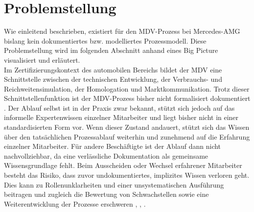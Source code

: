 \chapter{Problemstellung}
\label{chap:problemkontext}
Wie einleitend beschrieben, existiert für den MDV-Prozess bei Mercedes-AMG bislang kein dokumentiertes bzw. modelliertes Prozessmodell. Diese Problemstellung wird im folgenden Abschnitt anhand eines Big Picture visualisiert und erläutert.
\\
Im Zertifizierungskontext des automobilen Bereichs bildet der MDV eine Schnittstelle zwischen der technischen Entwicklung, der Verbrauchs- und Reichweitensimulation, der Homologation und Marktkommunikation. Trotz dieser Schnittstellenfunktion ist der MDV-Prozess bisher nicht formalisiert dokumentiert . Der Ablauf selbst ist in der Praxis zwar bekannt, stützt sich jedoch auf das informelle Expertenwissen einzelner Mitarbeiter und liegt bisher nicht in einer standardisierten Form vor. Wenn dieser Zustand andauert, stützt sich das Wissen über den tatsächlichen Prozessablauf weiterhin und zunehmend auf die Erfahrung einzelner Mitarbeiter. Für andere Beschäftigte ist der Ablauf dann nicht nachvollziehbar, da eine verlässliche Dokumentation als gemeinsame Wissensgrundlage fehlt. Beim Ausscheiden oder Wechsel erfahrener Mitarbeiter besteht das Risiko, dass zuvor undokumentiertes, implizites Wissen verloren geht. Dies kann zu Rollenunklarheiten und einer unsystematischen Ausführung beitragen und zugleich die Bewertung von Schwachstellen sowie eine Weiterentwicklung der Prozesse erschweren \cite{Hylko2005THANKSFT}, \cite{aspara2011documentation}, \cite{Droege2003EmployeeTA}. 

